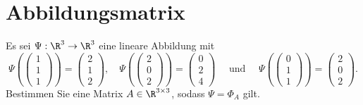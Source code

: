 \section{Abbildungsmatrix}
Es sei $\Psi: \R^3 \to \R^3$ eine lineare Abbildung mit
$$
\Psi(\begin{pmatrix}1\\1\\1 \end{pmatrix}) = \begin{pmatrix}2 \\ 1 \\ 2 \end{pmatrix}, \quad \Psi(\begin{pmatrix} 2 \\ 0\\ 2 \end{pmatrix}) = \begin{pmatrix}0\\2\\4 \end{pmatrix} \quad \text{ und } \quad \Psi(\begin{pmatrix} 0\\1\\1\end{pmatrix} )= \begin{pmatrix} 2 \\ 0 \\ 2\end{pmatrix}.
$$
Bestimmen Sie eine Matrix $A \in \R^{3\times 3}$, sodass $\Psi=\Phi_A$ gilt. 

